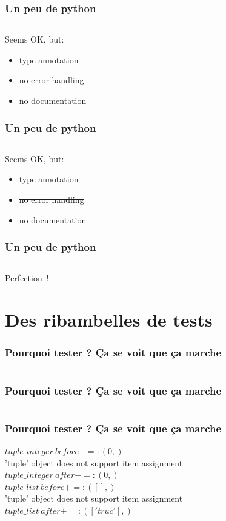 \documentclass{beamer}
\begin{document}
\begin{frame}
    \frametitle{Un peu de python}
    \inputminted{python}{../code/python/intro/intro_annotated.py}
    Seems OK, but:
    \begin{itemize}
        \item \sout{type annotation}
        \item no error handling
        \item no documentation
    \end{itemize}
\end{frame}

\begin{frame}
    \frametitle{Un peu de python}
    \inputminted{python}{../code/python/intro/intro_annotated_error.py}
    Seems OK, but:
    \begin{itemize}
        \item \sout{type annotation}
        \item \sout{no error handling}
        \item no documentation
    \end{itemize}
\end{frame}

\begin{frame}
    \frametitle{Un peu de python}
    \inputminted{python}{../code/python/intro/intro_annotated_error_doc.py}
    Perfection !
\end{frame}

\section{Des ribambelles de tests}




\begin{frame}
    \frametitle{Pourquoi tester ? Ça se voit que ça marche}
    \inputminted{python}{../code/python/intro/tuple_assign.py}
\end{frame}


\begin{frame}
    \frametitle{Pourquoi tester ? Ça se voit que ça marche}
    \inputminted{python}{../code/python/intro/__main__.py}
\end{frame}

\begin{frame}
    \frametitle{Pourquoi tester ? Ça se voit que ça marche}
    $tuple\_integer\ before += : (0,)$\\
    'tuple' object does not support item assignment\\
    $tuple\_integer\ after += : (0,)$\\

    $tuple\_list\ before += : ([],)$\\
    'tuple' object does not support item assignment\\
    $tuple\_list\ after += : (['truc'],)$
\end{frame}
\end{document}
